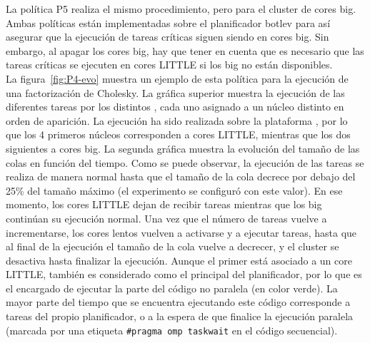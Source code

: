 La política P5 realiza el mismo procedimiento, pero para el cluster de
cores big. Ambas políticas están implementadas sobre el planificador botlev
para así asegurar que la ejecución de tareas críticas siguen siendo en
cores big. Sin embargo, al apagar los cores big, hay que tener en cuenta
que es necesario que las tareas críticas se ejecuten en cores LITTLE si los
big no están disponibles.\\
La figura~\ref{fig:P4-evo} muestra un ejemplo de esta política para la
ejecución de una factorización de Cholesky. La gráfica superior muestra la
ejecución de las diferentes tareas por los distintos \wts, cada uno
asignado a un núcleo distinto en orden de aparición. La ejecución ha sido
realizada sobre la plataforma \juno, por lo que los 4 primeros núcleos
corresponden a cores LITTLE, mientras que los dos siguientes a cores
big. La segunda gráfica muestra la evolución del tamaño de las colas en
función del tiempo. Como se puede observar, la ejecución de las tareas se
realiza de manera normal hasta que el tamaño de la cola decrece por debajo
del 25\% del tamaño máximo (el experimento se configuró con este valor). En
ese momento, los cores LITTLE dejan de recibir tareas mientras que los big
continúan su ejecución normal. Una vez que el número de tareas vuelve a
incrementarse, los cores lentos vuelven a activarse y a ejecutar tareas,
hasta que al final de la ejecución el tamaño de la cola vuelve a decrecer,
y el cluster se desactiva hasta finalizar la ejecución. Aunque el primer
\wt está asociado a un core LITTLE, también es considerado como el \wt
principal del planificador, por lo que es el encargado de ejecutar la parte
del código no paralela (en color verde). La mayor parte del tiempo que se
encuentra ejecutando este código corresponde a tareas del propio
planificador, o a la espera de que finalice la ejecución paralela (marcada
por una etiqueta \texttt{\#pragma omp taskwait} en el código secuencial).



